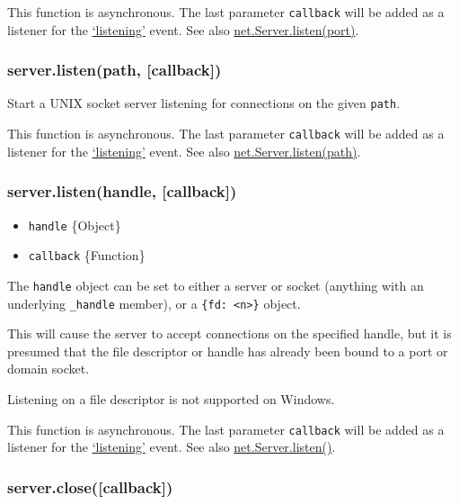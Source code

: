 This function is asynchronous. The last parameter \texttt{callback} will
be added as a listener for the
\href{net.html\#net\_event\_listening}{`listening'} event. See also
\href{net.html\#net\_server\_listen\_port\_host\_backlog\_callback}{net.Server.listen(port)}.

\subsubsection{server.listen(path, {[}callback{]})}

Start a UNIX socket server listening for connections on the given
\texttt{path}.

This function is asynchronous. The last parameter \texttt{callback} will
be added as a listener for the
\href{net.html\#net\_event\_listening}{`listening'} event. See also
\href{net.html\#net\_server\_listen\_path\_callback}{net.Server.listen(path)}.

\subsubsection{server.listen(handle, {[}callback{]})}

\begin{itemize}
\item
  \texttt{handle} \{Object\}
\item
  \texttt{callback} \{Function\}
\end{itemize}

The \texttt{handle} object can be set to either a server or socket
(anything with an underlying \texttt{\_handle} member), or a
\texttt{\{fd: \textless{}n\textgreater{}\}} object.

This will cause the server to accept connections on the specified
handle, but it is presumed that the file descriptor or handle has
already been bound to a port or domain socket.

Listening on a file descriptor is not supported on Windows.

This function is asynchronous. The last parameter \texttt{callback} will
be added as a listener for the
\href{net.html\#event\_listening\_}{`listening'} event. See also
\href{net.html\#net\_server\_listen\_handle\_callback}{net.Server.listen()}.

\subsubsection{server.close({[}callback{]})}

